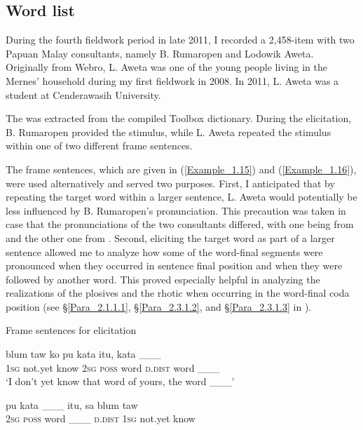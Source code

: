 {\subsection{Word list}\label{Para_1.11.6}
During the fourth fieldwork period in late 2011, I recorded a 2,458-item  with two Papuan Malay consultants, namely B. Rumaropen and Lodowik Aweta. Originally from Webro, L. Aweta was one of the young people living in the Mernes’ household during my first fieldwork in 2008. In 2011, L. Aweta was a student at Cenderawasih University.



The  was extracted from the compiled Toolbox dictionary. During the elicitation, B. Rumaropen provided the stimulus, while L. Aweta repeated the stimulus within one of two different frame sentences.



The frame sentences, which are given in (\ref{Example_1.15}) and (\ref{Example_1.16}), were used alternatively and served two purposes. First, I anticipated that by repeating the target word within a larger sentence, L. Aweta would potentially be less influenced by B. Rumaropen’s pronunciation. This precaution was taken in case that the pronunciations of the two consultants differed, with one being from  and the other one from . Second, eliciting the target word as part of a larger sentence allowed me to analyze how some of the word-final segments were pronounced when they occurred in sentence final position and when they were followed by another word. This proved especially helpful in analyzing the realizations of the plosives and the rhotic when occurring in the word-final coda position (see §\ref{Para_2.1.1.1}, §\ref{Para_2.3.1.2}, and §\ref{Para_2.3.1.3} in ).



\begin{styleExampleTitle}
{Frame sentences for  elicitation}
\end{styleExampleTitle}

\ea
\label{Example_1.15}
 {blum} {taw} {ko} {pu} {kata} {itu,} {kata} {\_\_\_}\\ %
 \textsc{1sg}  not.yet know \textsc{2sg} \textsc{poss} word \textsc{d.dist} word  \_\_\_\\

\glt 
‘I don’t yet know that word of yours, the word \_\_\_’
\z

\ea
\label{Example_1.16}
 {pu} {kata} {\_\_\_} {itu,} {sa} {blum} {taw}\\ %
 \textsc{2sg} \textsc{poss} word  \_\_\_  \textsc{d.dist} \textsc{1sg} not.yet know\\

}
